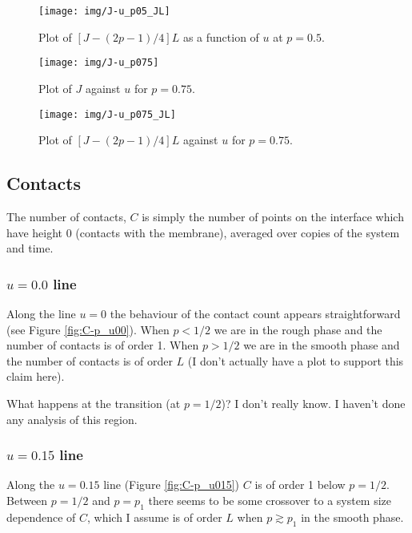 \documentclass[a4paper,10pt]{article}
\newcommand{\fref}[1]{Figure \ref{#1}}
\begin{document}
\begin{figure}
 \centering
 \texttt{[image: img/J-u\_p05\_JL]}
 \caption{Plot of $[J-(2p-1)/4]L$ as a function of $u$ at $p = 0.5$.}
 \label{fig:J-u_p05_JL}
\end{figure}
\begin{figure}
 \centering
 \texttt{[image: img/J-u\_p075]}
 \caption{Plot of $J$ against $u$ for $p = 0.75$.}
 \label{fig:J-u_p075}
\end{figure}
\begin{figure}
 \centering
 \texttt{[image: img/J-u\_p075\_JL]}
 \caption{Plot of $[J-(2p-1)/4]L$ against $u$ for $p = 0.75$.}
 \label{fig:J-u_p075_JL}
\end{figure}

\clearpage
\subsection{Contacts}

The number of contacts, $C$ is simply the number of points on the interface which have height $0$ (contacts with the membrane), averaged over copies of the system and time.

\subsubsection{$u=0.0$ line}

Along the line $u=0$ the behaviour of the contact count appears straightforward (see \fref{fig:C-p_u00}). When $p < 1/2$ we are in the rough phase and the number of contacts is of order 1. When $p > 1/2$ we are in the smooth phase and the number of contacts is of order $L$ (I don't actually have a plot to support this claim here).

What happens at the transition (at $p=1/2$)? I don't really know. I haven't done any analysis of this region.

\subsubsection{$u=0.15$ line}

Along the $u = 0.15$ line (\fref{fig:C-p_u015}) $C$ is of order 1 below $p=1/2$. Between $p=1/2$ and $p=p_1$ there seems to be some crossover to a system size dependence of $C$, which I assume is of order $L$ when $p\gtrsim p_1$ in the smooth phase. 
\end{document}
